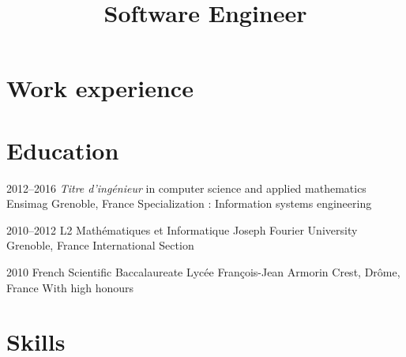 \documentclass[11pt,a4paper,sans]{moderncv} %
\title{Software Engineer}
\title{}
\begin{document}
\makecvtitle %
\vspace*{-0.75cm}


\section{Work experience}





\section{Education}
\cventry
    {2012--2016}
    {\textit{Titre d’ingénieur} in computer science and applied mathematics }
    {}
    {Ensimag}
    {Grenoble, France}
    {Specialization : Information systems engineering}
    
\cventry
    {2010--2012}
    {L2 Mathématiques et Informatique}
    {}
    {Joseph Fourier University}
    {Grenoble, France}
    {International Section}
    
\cventry
    {2010}
    {French Scientific Baccalaureate}
    {}
    {Lycée François-Jean Armorin}
    {Crest, Drôme, France}
    {With high honours}


\section{Skills}

\end{document}
